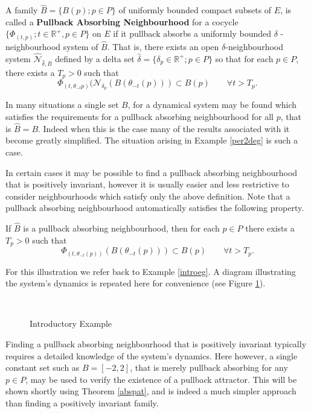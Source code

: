 \begin{defn} \label{PANdef}
   A family $\hat{B}=\{B(p);p \in P\}$ of uniformly bounded compact subsets
   of $E$, is called a {\bf Pullback Absorbing Neighbourhood} for a
   cocycle $\{\Phi_{(t,p)}; t \in \mathbb{R}^{+},p \in P\}$ on $E$
   if it pullback absorbs a uniformly bounded $\delta$ -
   neighbourhood system of $\hat{B}$. That is, there exists an open
   $\delta$-neighbourhood system
   $\hat{\mathcal{N}}_{\hat{\delta},\hat{B}}$ defined by a delta set
   $\hat{\delta} = \{\delta_p \in \mathbb{R}^+; p\in P\}$ so that for each
   $p \in P$, there exists a $T_p>0$ such that
   \begin{equation}
     \Phi_{(t,\theta_{-t}p)}(\mathcal{N}_{\delta_p}(B(\theta_{-t}(p)))
     \subset B(p) \qquad \forall t > T_p.
   \end{equation}
\end{defn}

In many situations a single set $B$, for a dynamical system may be found
which satisfies the requirements for a pullback absorbing neighbourhood for
all $p$, that is $\hat{B} = B$. Indeed when this is the case many of the
results associated with it become greatly simplified. The situation arising
in Example \ref{per2deg} is such a case.

In certain cases it may be possible to find a pullback absorbing
neighbourhood that is positively invariant, however it is usually easier
and less restrictive to consider neighbourhoods which satisfy only the
above definition. Note that a pullback absorbing neighbourhood
automatically satisfies the following property.

\begin{lemma} \label{panepilem}
If $\hat{B}$ is a pullback absorbing neighbourhood, then for each $p \in P$
there exists a $T_p > 0$ such that
\[ \Phi_{(t,\theta_{-t}(p))}(B(\theta_{-t}(p)))
     \subset B(p) \qquad \forall t > T_p. \]
\end{lemma}

\vspace{0.5cm}

\begin{eg}
For this illustration we refer back to Example \ref{introeg}. A diagram
illustrating the system's dynamics is repeated here for convenience (see
Figure \ref{pb2eg}).
\begin{figure}[htb]
\begin{center}
\leavevmode
\hbox{
\epsfxsize=9.5cm
  }%
\protect\caption{Introductory Example}\protect\label{pb2eg}
\end{center}
\end{figure}

Finding a pullback absorbing neighbourhood that is
positively invariant typically requires a detailed knowledge of the system's
dynamics. Here however, a single constant set such as $B =
[-2,2]$, that is merely pullback absorbing for any $p \in P$, may be used
to verify the existence of a pullback attractor. This will be shown shortly
using Theorem \ref{abspat}, and is indeed a much simpler approach than finding a
positively invariant family.
\end{eg}

